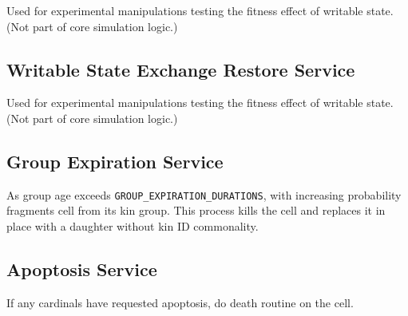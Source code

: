 
Used for experimental manipulations testing the fitness effect of writable state.
(Not part of core simulation logic.)

\subsection{Writable State Exchange Restore Service}


Used for experimental manipulations testing the fitness effect of writable state.
(Not part of core simulation logic.)

\subsection{Group Expiration Service}


As group age exceeds \texttt{GROUP\_EXPIRATION\_DURATIONS}, with increasing probability fragments cell from its kin group.
This process kills the cell and replaces it in place with a daughter without kin ID commonality.

\subsection{Apoptosis Service}


If any cardinals have requested apoptosis, do death routine on the cell.
